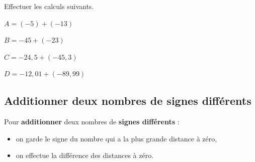 \documentclass[a4paper]{book}
\begin{document}
    
    \begin{exemple}
        Effectuer les calculs suivants.

        \medskip
        
        \begin{minipage}{0.24\linewidth}
            $A = (-5)+ (-13)$

            \vspace{2cm}
        \end{minipage}
        \hfill\vline\hfill
        \begin{minipage}{0.24\linewidth}
            $B=-45+(-23)$

            \vspace{2cm}
        \end{minipage}
        \hfill\vline\hfill
        \begin{minipage}{0.24\linewidth}
            $C=-24,5+(-45,3)$

            \vspace{2cm}
        \end{minipage}
        \hfill\vline\hfill
        \begin{minipage}{0.24\linewidth}
            $D=-12,01+(-89,99)$

            \vspace{2cm}
        \end{minipage}
    \end{exemple}


\subsection{Additionner deux nombres de signes différents}
    
    \begin{definition}[Addition]
        Pour \textbf{additionner} deux nombres de \textbf{signes différents} :
        \begin{itemize}
            \item on garde le signe du nombre qui a la plus grande distance à zéro,
            \item on effectue la différence des distances à zéro.
        \end{itemize}
    \end{definition}
    
\end{document}
